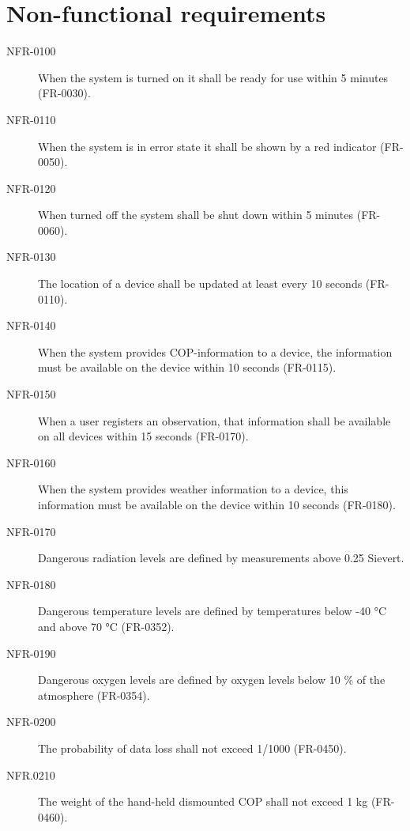 \section{Non-functional requirements}
\begin{description}
\item[NFR-0100] When the system is turned on it shall be ready for use within 5 minutes (FR-0030).
\item[NFR-0110] When the system is in error state it shall be shown by a red indicator (FR-0050).
\item[NFR-0120] When turned off the system shall be shut down within 5 minutes (FR-0060).
\item[NFR-0130] The location of a device shall be updated at least every 10 seconds (FR-0110).
\item[NFR-0140] When the system provides COP-information to a device, the information must be available on the device within 10 seconds (FR-0115).
\item[NFR-0150] When a user registers an observation, that information shall be available on all devices within 15 seconds (FR-0170).
\item[NFR-0160] When the system provides weather information to a device, this information must be available on the device within 10 seconds (FR-0180).
\item[NFR-0170] Dangerous radiation levels are defined by measurements above 0.25 Sievert.
\item[NFR-0180] Dangerous temperature levels are defined by temperatures below -40 °C and above 70 °C (FR-0352).
\item[NFR-0190] Dangerous oxygen levels are defined by oxygen levels below 10 \% of the atmosphere (FR-0354).
\item[NFR-0200] The probability of data loss shall not exceed 1/1000 (FR-0450).
\item[NFR.0210] The weight of the hand-held dismounted COP shall not exceed 1 kg (FR-0460).
\end{description}
